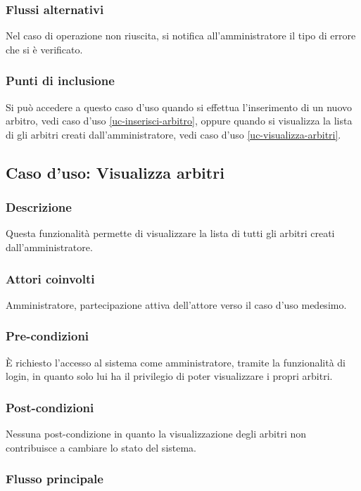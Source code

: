 \subsubsection*{Flussi alternativi}
Nel caso di operazione non riuscita, si notifica all'amministratore il tipo di errore che si è verificato.

\subsubsection*{Punti di inclusione}
Si può accedere a questo caso d'uso quando si effettua l'inserimento di un nuovo arbitro, vedi caso d'uso \vref{uc-inserisci-arbitro}, oppure quando si visualizza la lista di gli arbitri creati dall'amministratore, vedi caso d'uso \vref{uc-visualizza-arbitri}.


%
%
\subsection{Caso d'uso: Visualizza arbitri}
\label{uc-visualizza-arbitri}

\subsubsection*{Descrizione}
Questa funzionalità permette di visualizzare la lista di tutti gli arbitri creati dall'amministratore.

\subsubsection*{Attori coinvolti}
Amministratore, partecipazione attiva dell'attore verso il caso d'uso medesimo.

\subsubsection*{Pre-condizioni}
È richiesto l'accesso al sistema come amministratore, tramite la funzionalità di login, in quanto solo lui ha il privilegio di poter visualizzare i propri arbitri.

\subsubsection*{Post-condizioni}
Nessuna post-condizione in quanto la visualizzazione degli arbitri non contribuisce a cambiare lo stato del sistema.

\subsubsection*{Flusso principale}

